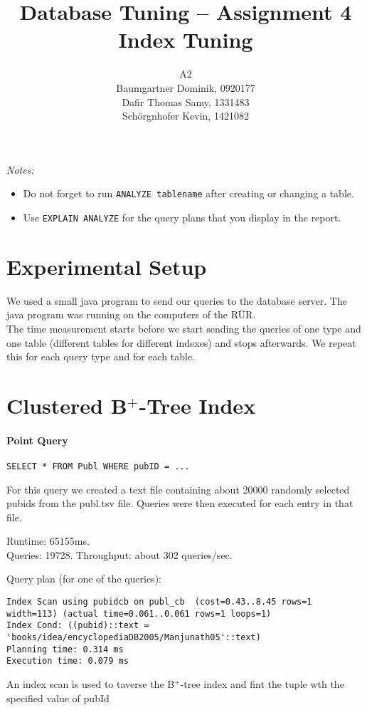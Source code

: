 \documentclass[11pt]{scrartcl}
\title{
  \textbf{\large Database Tuning -- Assignment 4}\\
  Index Tuning
}
\author{
	A2\\
	\large Baumgartner Dominik, 0920177 \\
	\large Dafir Thomas Samy, 1331483 \\
	\large Sch\"orgnhofer Kevin, 1421082
}
\begin{document}
\maketitle

\noindent
{\it Notes:}
\begin{itemize}\itemsep=0pt
\item Do not forget to run {\tt ANALYZE tablename} after creating or
  changing a table.
\item Use {\tt EXPLAIN ANALYZE} for the query plans that you display in the report.
\end{itemize}


\section{Experimental Setup}

We used a small java program to send our queries to the database server. The java program was running on the computers of the R\"UR.\\
The time measurement starts before we start sending the queries of one type and one table (different tables for different indexes) and stops afterwards. We repeat this for each query type and for each table.

\section{Clustered B$^+$-Tree Index}

\paragraph{Point Query}

{\small
\begin{verbatim}
SELECT * FROM Publ WHERE pubID = ...
\end{verbatim}
}

\noindent
For this query we created a text file containing about 20000 randomly selected pubids from the publ.tsv file. Queries were then executed for each entry in that file.

\smallskip\noindent
Runtime: 65155ms. \\
Queries: 19728.
Throughput: about 302 queries/sec.

\smallskip\noindent
Query plan (for one of the queries):
{\small
\begin{verbatim}
Index Scan using pubidcb on publ_cb  (cost=0.43..8.45 rows=1 width=113) (actual time=0.061..0.061 rows=1 loops=1)
Index Cond: ((pubid)::text = 'books/idea/encyclopediaDB2005/Manjunath05'::text)
Planning time: 0.314 ms
Execution time: 0.079 ms
\end{verbatim}
An index scan is used to taverse the B$^+$-tree index and fint the tuple wth the specified value of pubId 
}
\end{document}
